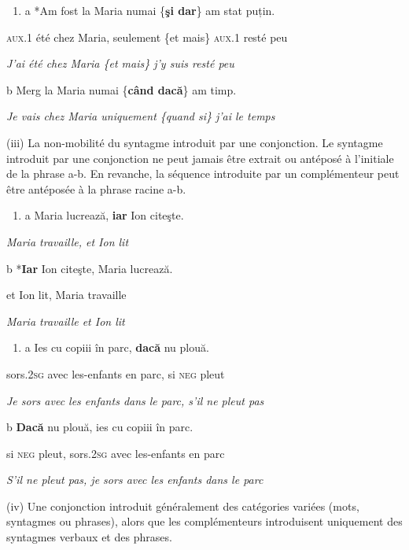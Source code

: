 \begin{enumerate}
\item \label{bkm:Ref300169830}a  *Am  fost  la  Maria  numai  \{\textbf{şi {\textbar} dar}\}  am  stat  puțin.


\end{enumerate}
\textsc{aux.1}  été  chez  Maria,  seulement  \{et {\textbar} mais\}  \textsc{aux.1}  resté  peu 

{\itshape
J'ai été chez Maria \{et {\textbar} mais\} j'y suis resté peu}

  b  Merg la Maria numai \{\textbf{când {\textbar} dacă}\} am timp.

    \textit{Je vais chez Maria uniquement \{quand {\textbar} si\} j'ai le temps}

(iii) La non-mobilité du syntagme introduit par une conjonction. Le syntagme introduit par une conjonction ne peut jamais être extrait ou antéposé à l'initiale de la phrase a-b. En revanche, la séquence introduite par un complémenteur peut être antéposée à la phrase racine a-b. 


\begin{enumerate}
\item \label{bkm:Ref300178038}a  Maria lucrează, \textbf{iar} Ion citeşte.


\end{enumerate}
{\itshape
Maria travaille, et Ion lit}

  b  *\textbf{Iar}  Ion  citeşte,  Maria  lucrează.

    et  Ion  lit,  Maria  travaille

    \textit{Maria travaille et Ion lit}


\begin{enumerate}
\item \label{bkm:Ref300178055}a  Ies  cu  copiii  în  parc,  \textbf{dacă}  nu  plouă.


\end{enumerate}
sors\textsc{.2sg}  avec  les-enfants  en  parc,  si  \textsc{neg}  pleut 

{\itshape
Je sors avec les enfants dans le parc, s'il ne pleut pas}

  b  \textbf{Dacă}  nu  plouă,  ies  cu  copiii  în  parc.

    si  \textsc{neg}  pleut,  sors\textsc{.2sg}  avec  les-enfants  en  parc

    \textit{S'il ne pleut pas, je sors avec les enfants dans le parc}

(iv) Une conjonction introduit généralement des catégories variées (mots, syntagmes ou phrases), alors que les complémenteurs introduisent uniquement des syntagmes verbaux et des phrases.

